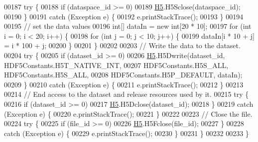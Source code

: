 \begin{DoxyCode}
00187         \textcolor{keywordflow}{try} \{
00188             \textcolor{keywordflow}{if} (dataspace\_id >= 0)
00189                 \hyperlink{namespace_h5}{H5}.H5Sclose(dataspace\_id);
00190         \}
00191         \textcolor{keywordflow}{catch} (Exception e) \{
00192             e.printStackTrace();
00193         \}
00194 
00195         \textcolor{comment}{// set the data values}
00196         \textcolor{keywordtype}{int}[] dataIn = \textcolor{keyword}{new} \textcolor{keywordtype}{int}[20 * 10];
00197         \textcolor{keywordflow}{for} (\textcolor{keywordtype}{int} i = 0; i < 20; i++) \{
00198             \textcolor{keywordflow}{for} (\textcolor{keywordtype}{int} j = 0; j < 10; j++) \{
00199                 dataIn[i * 10 + j] = i * 100 + j;
00200             \}
00201         \}
00202 
00203         \textcolor{comment}{// Write the data to the dataset.}
00204         \textcolor{keywordflow}{try} \{
00205             \textcolor{keywordflow}{if} (dataset\_id >= 0)
00206                 \hyperlink{namespace_h5}{H5}.H5Dwrite(dataset\_id, HDF5Constants.H5T\_NATIVE\_INT,
00207                         HDF5Constants.H5S\_ALL, HDF5Constants.H5S\_ALL,
00208                         HDF5Constants.H5P\_DEFAULT, dataIn);
00209         \}
00210         \textcolor{keywordflow}{catch} (Exception e) \{
00211             e.printStackTrace();
00212         \}
00213 
00214         \textcolor{comment}{// End access to the dataset and release resources used by it.}
00215         \textcolor{keywordflow}{try} \{
00216             \textcolor{keywordflow}{if} (dataset\_id >= 0)
00217                 \hyperlink{namespace_h5}{H5}.H5Dclose(dataset\_id);
00218         \}
00219         \textcolor{keywordflow}{catch} (Exception e) \{
00220             e.printStackTrace();
00221         \}
00222 
00223         \textcolor{comment}{// Close the file.}
00224         \textcolor{keywordflow}{try} \{
00225             \textcolor{keywordflow}{if} (file\_id >= 0)
00226                 \hyperlink{namespace_h5}{H5}.H5Fclose(file\_id);
00227         \}
00228         \textcolor{keywordflow}{catch} (Exception e) \{
00229             e.printStackTrace();
00230         \}
00231     \}
00232 
00233 \}
\end{DoxyCode}
